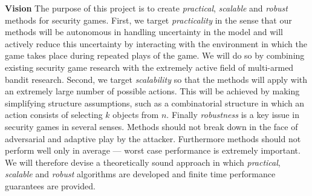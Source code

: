 
\textbf{Vision}
The purpose of this project is to create \textit{practical}, \textit{scalable} and \textit{robust} methods for security games. First, we target \textit{practicality}  in the sense that our methods will be autonomous in handling uncertainty in the model and will actively reduce this uncertainty by interacting with the environment in which the game takes place during repeated plays of the game. %
We will do so by combining existing security game research with the extremely active field of multi-armed bandit research. 
Second, we target \textit{scalability} so that the methods will apply with an extremely large number of possible actions. This will be achieved by making simplifying structure assumptions, such as a combinatorial structure in which an action consists of selecting $k$ objects from $n$. %
Finally \textit{robustness}  is a key issue in security games in several senses.  Methods should not break down in the face of adversarial and adaptive play by the attacker. %
Furthermore methods should not perform well only in average --- worst case performance is extremely important.  We will therefore devise a theoretically sound approach in which {\em practical}, {\em scalable} and {\em robust} algorithms are developed and finite time performance guarantees are provided.\\

